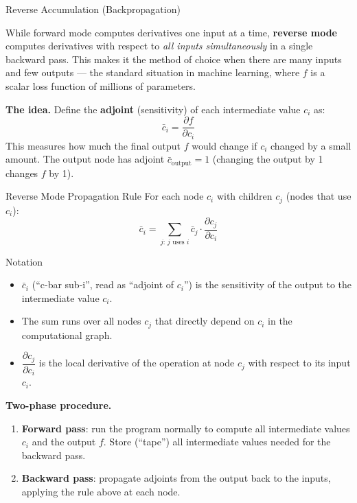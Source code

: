 \documentclass[aspectratio=169,10pt]{beamer}
\begin{document}
\begin{frame}[allowframebreaks]{Reverse Accumulation (Backpropagation)}

  While forward mode computes derivatives one input at a time,
  \textbf{reverse mode} computes derivatives with respect to
  \emph{all inputs simultaneously} in a single backward pass.
  This makes it the method of choice when there are many inputs and
  few outputs --- the standard situation in machine learning, where
  $f$ is a scalar loss function of millions of parameters.

  \medskip
  \textbf{The idea.}
  Define the \textbf{adjoint} (sensitivity) of each intermediate value
  $c_i$ as:
  \[
    \bar{c}_i = \frac{\partial f}{\partial c_i}
  \]
  This measures how much the final output $f$ would change if $c_i$
  changed by a small amount.  The output node has adjoint
  $\bar{c}_{\text{output}} = 1$ (changing the output by 1 changes $f$
  by 1).

  \begin{block}{Reverse Mode Propagation Rule}
    For each node $c_i$ with children $c_j$ (nodes that use $c_i$):
    \[
      \bar{c}_i
      = \sum_{j:\,j\text{ uses }i}
        \bar{c}_j \cdot \frac{\partial c_j}{\partial c_i}
    \]
  \end{block}

  \begin{block}{Notation}
    \begin{itemize}
      \item $\bar{c}_i$ (``c-bar sub-i'', read as ``adjoint of $c_i$'')
            is the sensitivity of the output to the intermediate value $c_i$.
      \item The sum runs over all nodes $c_j$ that directly depend on $c_i$
            in the computational graph.
      \item $\dfrac{\partial c_j}{\partial c_i}$ is the local derivative
            of the operation at node $c_j$ with respect to its input $c_i$.
    \end{itemize}
  \end{block}

  \framebreak

  \textbf{Two-phase procedure.}
  \begin{enumerate}
    \item \textbf{Forward pass}: run the program normally to compute
          all intermediate values $c_i$ and the output $f$.  Store
          (``tape'') all intermediate values needed for the backward pass.
    \item \textbf{Backward pass}: propagate adjoints from the output back
          to the inputs, applying the rule above at each node.
  \end{enumerate}


\end{frame}
\end{document}

